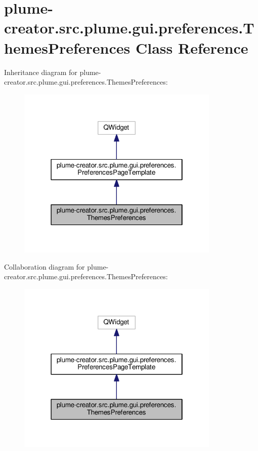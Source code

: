 \hypertarget{classplume-creator_1_1src_1_1plume_1_1gui_1_1preferences_1_1_themes_preferences}{}\section{plume-\/creator.src.\+plume.\+gui.\+preferences.\+Themes\+Preferences Class Reference}
\label{classplume-creator_1_1src_1_1plume_1_1gui_1_1preferences_1_1_themes_preferences}


Inheritance diagram for plume-\/creator.src.\+plume.\+gui.\+preferences.\+Themes\+Preferences\+:\nopagebreak
\begin{figure}[H]
\begin{center}
\leavevmode
\includegraphics[width=274pt]{classplume-creator_1_1src_1_1plume_1_1gui_1_1preferences_1_1_themes_preferences__inherit__graph}
\end{center}
\end{figure}


Collaboration diagram for plume-\/creator.src.\+plume.\+gui.\+preferences.\+Themes\+Preferences\+:\nopagebreak
\begin{figure}[H]
\begin{center}
\leavevmode
\includegraphics[width=274pt]{classplume-creator_1_1src_1_1plume_1_1gui_1_1preferences_1_1_themes_preferences__coll__graph}
\end{center}
\end{figure}
